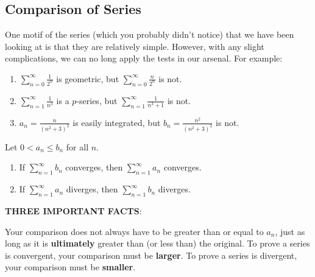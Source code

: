 \documentclass[addpoints, 12pt]{exam}
\begin{document}
\newpage
{}
\subsection*{Comparison of Series}
One motif of the series (which you probably didn't notice) that we have been looking at is that they are relatively simple. However, with any slight complications, we can no long apply the tests in our arsenal. For example:

\begin{enumerate}
    \item $\displaystyle\sum_{n=0}^\infty\frac{1}{2^n}$ is geometric, but $\displaystyle\sum_{n=0}^{\infty}\frac{n}{2^n}$ is not.
    \item $\displaystyle\sum_{n=1}^{\infty}\frac{1}{n^3}$ is a $p$-series, but $\displaystyle\sum_{n=1}^\infty\frac{1}{n^3+1}$ is not.
    \item $\displaystyle a_n=\frac{n}{(n^2+3)^2}$ is easily integrated, but $\displaystyle b_n=\frac{n^2}{(n^2+3)^2}$ is not.
\end{enumerate}

\vspace{.07in}

\begin{tcolorbox}[title= THE DIRECT COMPARISON TEST,black,sharp corners,colback=white,colbacktitle=white,coltitle=black]

    Let $0<a_n\le b_n$ for all $n$.\\
    \begin{enumerate}
        \item If $\displaystyle\sum_{n=1}^\infty b_n$ converges, then $\displaystyle\sum_{n=1}^\infty a_n$ converges.
        \item If $\displaystyle\sum_{n=1}^\infty a_n$ diverges, then $\displaystyle\sum_{n=1}^\infty b_n$ diverges.
    \end{enumerate}

\end{tcolorbox}
\vspace{.07in}
\noindent\textbf{THREE IMPORTANT FACTS}:
\begin{questions}
    \question Your comparison does not always have to be greater than or equal to $a_n$, just as long as it is \textbf{ultimately} greater than (or less than) the original.
    \question To prove a series is convergent, your comparison must be \textbf{larger}.
    \question To prove a series is divergent, your comparison must be \textbf{smaller}.
\end{questions}
\end{document}

